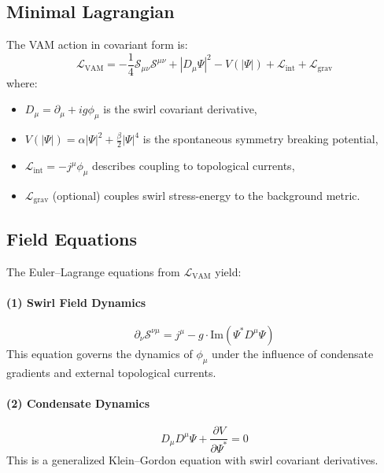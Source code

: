         \subsection{Minimal Lagrangian}
        The VAM action in covariant form is:
        \begin{equation}
            \mathcal{L}_\text{VAM} = -\frac{1}{4} \mathcal{S}_{\mu\nu} \mathcal{S}^{\mu\nu} + |D_\mu \Psi|^2 - V(|\Psi|) + \mathcal{L}_{\text{int}} + \mathcal{L}_{\text{grav}}
        \end{equation}
        where:
        \begin{itemize}
            \item $D_\mu = \partial_\mu + i g \phi_\mu$ is the swirl covariant derivative,
            \item $V(|\Psi|) = \alpha |\Psi|^2 + \frac{\beta}{2} |\Psi|^4$ is the spontaneous symmetry breaking potential,
            \item $\mathcal{L}_{\text{int}} = -j^\mu \phi_\mu$ describes coupling to topological currents,
            \item $\mathcal{L}_{\text{grav}}$ (optional) couples swirl stress-energy to the background metric.
        \end{itemize}

        \subsection{Field Equations}
        The Euler--Lagrange equations from $\mathcal{L}_\text{VAM}$ yield:
        \paragraph{(1) Swirl Field Dynamics}
        \begin{equation}
            \partial_\nu \mathcal{S}^{\nu\mu} = j^\mu - g \cdot \mathrm{Im}(\Psi^* D^\mu \Psi)
        \end{equation}
        This equation governs the dynamics of $\phi_\mu$ under the influence of condensate gradients and external topological currents.

        \paragraph{(2) Condensate Dynamics}
        \begin{equation}
            D_\mu D^\mu \Psi + \frac{\partial V}{\partial \Psi^*} = 0
        \end{equation}
        This is a generalized Klein--Gordon equation with swirl covariant derivatives.

